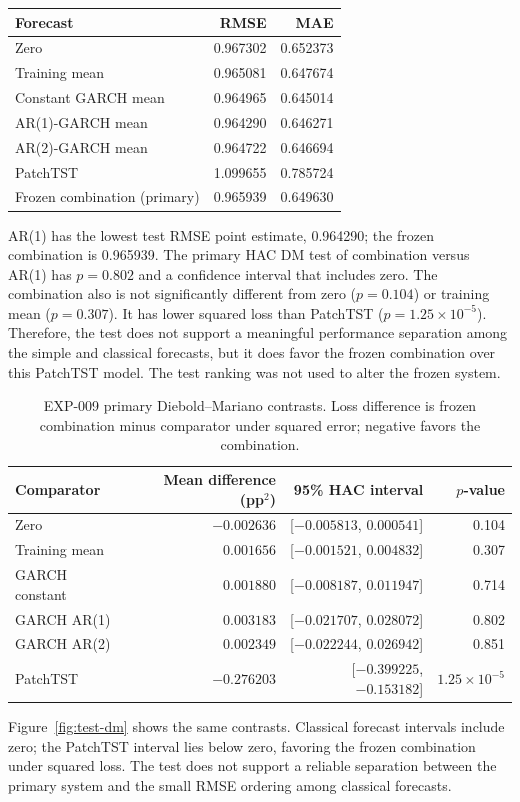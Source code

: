 \documentclass[11pt,a4paper]{article}
\begin{document}
\begin{center}
\begin{tabular}{lrr}
\toprule
Forecast & RMSE & MAE\\
\midrule
Zero & 0.967302 & 0.652373\\
Training mean & 0.965081 & 0.647674\\
Constant GARCH mean & 0.964965 & 0.645014\\
AR(1)-GARCH mean & 0.964290 & 0.646271\\
AR(2)-GARCH mean & 0.964722 & 0.646694\\
PatchTST & 1.099655 & 0.785724\\
Frozen combination (primary) & 0.965939 & 0.649630\\
\bottomrule
\end{tabular}
\end{center}
AR(1) has the lowest test RMSE point estimate, 0.964290; the frozen combination is 0.965939.
The primary HAC DM test of combination versus AR(1) has $p=0.802$ and a confidence interval
that includes zero. The combination also is not significantly different from zero ($p=0.104$)
or training mean ($p=0.307$). It has lower squared loss than PatchTST ($p=1.25\times10^{-5}$).
Therefore, the test does not support a meaningful performance separation among the simple and
classical forecasts, but it does favor the frozen combination over this PatchTST model. The
test ranking was not used to alter the frozen system.

\begin{table}[htbp]
\centering\small
\caption{EXP-009 primary Diebold--Mariano contrasts. Loss difference is frozen combination
minus comparator under squared error; negative favors the combination.}
\label{tab:test-dm}
\begin{tabular}{lrrr}
\toprule
Comparator & Mean difference (pp$^2$) & 95\% HAC interval & $p$-value\\
\midrule
Zero & $-0.002636$ & [$-0.005813$, $0.000541$] & 0.104\\
Training mean & $0.001656$ & [$-0.001521$, $0.004832$] & 0.307\\
GARCH constant & $0.001880$ & [$-0.008187$, $0.011947$] & 0.714\\
GARCH AR(1) & $0.003183$ & [$-0.021707$, $0.028072$] & 0.802\\
GARCH AR(2) & $0.002349$ & [$-0.022244$, $0.026942$] & 0.851\\
PatchTST & $-0.276203$ & [$-0.399225$, $-0.153182$] & $1.25\times10^{-5}$\\
\bottomrule
\end{tabular}
\end{table}
Figure~\ref{fig:test-dm} shows the same contrasts. Classical forecast intervals include zero;
the PatchTST interval lies below zero, favoring the frozen combination under squared loss. The
test does not support a reliable separation between the primary system and the small RMSE
ordering among classical forecasts.
\end{document}
